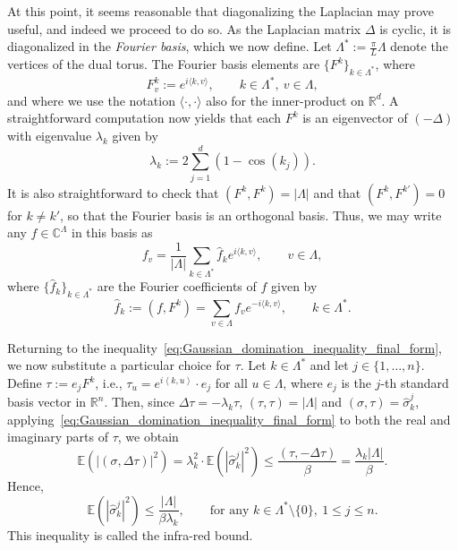 \documentclass[12pt,reqno]{article}
\def\R{\mathbb{R}}
\def\C{\mathbb{C}}
\def\E{\mathbb{E}}
\begin{document}
At this point, it seems reasonable that diagonalizing the Laplacian may prove useful, and indeed we proceed to do so. As the Laplacian matrix $\Delta$ is cyclic, it is diagonalized in the \emph{Fourier basis}, which we now define. Let $\Lambda^* := \frac{\pi}{L} \Lambda$ denote the vertices of the dual torus. The Fourier basis elements are $\{ F^k \}_{k \in \Lambda^*}$, where
\[ F^k_v := e^{i \langle k,v \rangle} , \qquad k \in \Lambda^*,~v \in \Lambda ,\]
and where we use the notation $\langle \cdot,\cdot\rangle$ also for the inner-product on $\R^d$. A straightforward computation now yields that each $F^k$ is an eigenvector of $(-\Delta)$ with eigenvalue $\lambda_k$ given by
\begin{equation}\label{eq:Laplacian_eigenvalues}
\lambda_k := 2 \sum_{j=1}^d (1 - \cos(k_j)) .
\end{equation}
It is also straightforward to check that $(F^k,F^k) = |\Lambda|$ and that $(F^k,F^{k'})=0$ for $k \neq k'$, so that the Fourier basis is an orthogonal basis.
Thus, we may write any $f \in \C^\Lambda$ in this basis as
\[ f_v = \frac{1}{|\Lambda|} \sum_{k \in \Lambda^*} \hat{f}_k e^{i\langle k,v\rangle} , \qquad v \in \Lambda ,\]
where $\{\hat{f}_k\}_{k \in \Lambda^*}$ are the Fourier coefficients of $f$ given by
\[ \hat{f}_k := (f,F^k) = \sum_{v \in \Lambda} f_v e^{-i\langle k,v\rangle}, \qquad k \in \Lambda^* .\]

Returning to the inequality~\eqref{eq:Gaussian_domination_inequality_final_form}, we now substitute a particular choice for $\tau$. Let $k \in \Lambda^*$ and let $j \in \{1,\dots,n\}$. Define $\tau := e_j F^k$, i.e., $\tau_u = e^{i\left\langle k, u\right\rangle} \cdot e_j$ for all $u \in \Lambda$, where $e_j$ is the $j$-th standard basis vector in $\R^n$. Then, since $\Delta \tau = -\lambda_k \tau$, $(\tau,\tau)=|\Lambda|$ and $(\sigma,\tau)=\hat{\sigma}^j_k$, applying~\eqref{eq:Gaussian_domination_inequality_final_form} to both the real and imaginary parts of $\tau$, we obtain
\[ \E\left(|(\sigma,\Delta\tau)|^2\right) = \lambda_k^2 \cdot \E\left(|\hat{\sigma}^j_k|^2\right) \le \frac{(\tau,-\Delta\tau)}{\beta} = \frac{\lambda_k |\Lambda|}{\beta} .\]
Hence,
\begin{equation}\label{eq:infra_red_bound}
\E\left(|\hat{\sigma}^j_k|^2\right) \le \frac{|\Lambda|}{\beta \lambda_k} ,\qquad\text{for any }k \in \Lambda^* \setminus \{0\},~1 \le j \le n .
\end{equation}
This inequality is called the infra-red bound.
\end{document}
